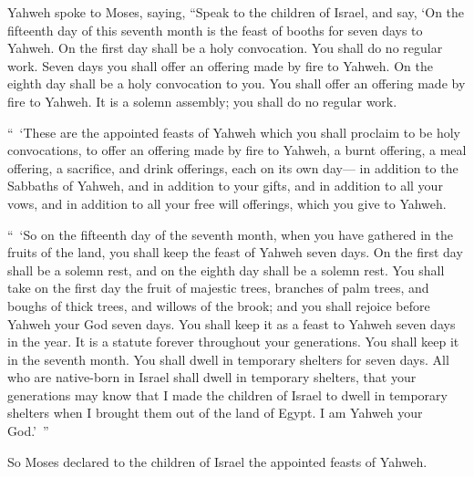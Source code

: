 {\par }{\PP {}Yahweh spoke to Moses, saying,
“Speak to the children of Israel, and say, ‘On the fifteenth day of this seventh month is the feast of booths for seven days to Yahweh.
On the first day shall be a holy convocation. You shall do no regular work.
Seven days you shall offer an offering made by fire to Yahweh. On the eighth day shall be a holy convocation to you. You shall offer an offering made by fire to Yahweh. It is a solemn assembly; you shall do no regular work.
\par }{\PP {}“ ‘These are the appointed feasts of Yahweh which you shall proclaim to be holy convocations, to offer an offering made by fire to Yahweh, a burnt offering, a meal offering, a sacrifice, and drink offerings, each on its own day—
in addition to the Sabbaths of Yahweh, and in addition to your gifts, and in addition to all your vows, and in addition to all your free will offerings, which you give to Yahweh.
\par }{\PP {}“ ‘So on the fifteenth day of the seventh month, when you have gathered in the fruits of the land, you shall keep the feast of Yahweh seven days. On the first day shall be a solemn rest, and on the eighth day shall be a solemn rest.
You shall take on the first day the fruit of majestic trees, branches of palm trees, and boughs of thick trees, and willows of the brook; and you shall rejoice before Yahweh your God seven days.
You shall keep it as a feast to Yahweh seven days in the year. It is a statute forever throughout your generations. You shall keep it in the seventh month.
You shall dwell in temporary shelters for seven days. All who are native-born in Israel shall dwell in temporary shelters,
that your generations may know that I made the children of Israel to dwell in temporary shelters when I brought them out of the land of Egypt. I am Yahweh your God.’ ”
\par }{\PP {}So Moses declared to the children of Israel the appointed feasts of Yahweh.

}
